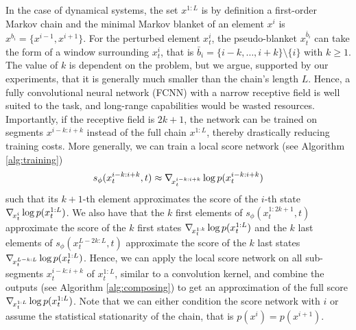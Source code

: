 In the case of dynamical systems, the set $x^{1:L}$ is by definition a first-order Markov chain and the minimal Markov blanket of an element $x^i$ is $x^{b_i} = \{x^{i-1}, x^{i+1}\}$. For the perturbed element $x^i_t$, the pseudo-blanket $x^{\bar{b}_i}_t$ can take the form of a window surrounding $x^i_t$, that is $\bar{b}_i = \{i-k, \dots, i+k\} \setminus \{i\}$ with $k \geq 1$. The value of $k$ is dependent on the problem, but we argue, supported by our experiments, that it is generally much smaller than the chain's length $L$. Hence, a fully convolutional neural network (FCNN) with a narrow receptive field is well suited to the task, and long-range capabilities would be wasted resources. Importantly, if the receptive field is $2k + 1$, the network can be trained on segments $x^{i-k:i+k}$ instead of the full chain $x^{1:L}$, thereby drastically reducing training costs. More generally, we can train a local score network (see Algorithm \ref{alg:training})
\begin{equation}
    s_\phi(x^{i-k:i+k}_t, t) \approx \nabla_{\!{x^{i-k:i+k}_t}} \log p(x^{i-k:i+k}_t)
\end{equation}
such that its $k+1$-th element approximates the score of the $i$-th state $\nabla_{\!{x^i_t}} \log p(x^{1:L}_t)$. We also have that the $k$ first elements of $s_\phi(x^{1:2k+1}_t, t)$ approximate the score of the $k$ first states $\nabla_{\!{x^{1:k}_t}} \log p(x^{1:L}_t)$ and the $k$ last elements of $s_\phi(x^{L-2k:L}_t, t)$ approximate the score of the $k$ last states $\nabla_{\!{x^{L-k:L}_t}} \log p(x^{1:L}_t)$. Hence, we can apply the local score network on all sub-segments $x^{i-k:i+k}_t$ of $x^{1:L}_t$, similar to a convolution kernel, and combine the outputs (see Algorithm \ref{alg:composing}) to get an approximation of the full score $\nabla_{\!{x^{1:L}_t}} \log p(x^{1:L}_t)$. Note that we can either condition the score network with $i$ or assume the statistical stationarity of the chain, that is $p(x^i) = p(x^{i+1})$.

